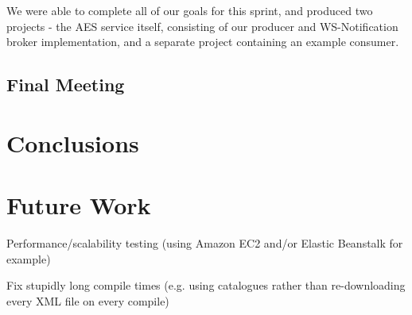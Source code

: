 \documentclass[a4paper, 12pt]{article}
\begin{document}
We were able to complete all of our goals for this sprint, and produced two projects - the AES service itself, consisting of our producer and WS-Notification broker implementation, and a separate project containing an example consumer.

\subsection{Final Meeting}

\section{Conclusions}
\label{sec:conclusions}

\newpage

\section{Future Work}

Performance/scalability testing (using Amazon EC2 and/or Elastic Beanstalk for example)

Fix stupidly long compile times (e.g. using catalogues rather than re-downloading every XML file on every compile)

\newpage

\sloppy
\printbibliography

\appendix
\end{document}
